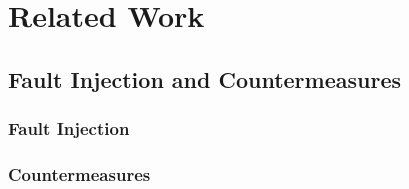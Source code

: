\section{Related Work}
\subsection{Fault Injection and Countermeasures}\label{sub:faultCounter}
\subsubsection{Fault Injection}
\subsubsection{Countermeasures}\label{subsec:countermeasures}


